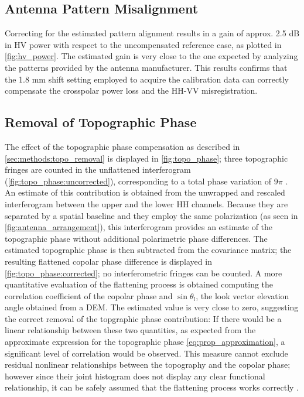 \subsection{Antenna Pattern Misalignment}\label{sec:discussion:misalignment}
Correcting for the estimated pattern alignment results in a gain of approx. 2.5 dB  in HV power with respect to the uncompensated reference case, as plotted in \autoref{fig:hv_power}. The estimated gain is very close to the one expected by analyzing the patterns provided by the antenna manufacturer. This results confirms that the 1.8 mm shift setting employed to acquire the calibration data can correctly compensate the crosspolar power loss and the HH-VV misregistration.
\subsection{Removal of Topographic Phase}
The effect of the topographic phase compensation as described in \autoref{sec:methods:topo_removal} is displayed in \autoref{fig:topo_phase};
three topographic fringes are counted in the unflattened interferogram (\autoref{fig:topo_phase:uncorrected}), corresponding to a total phase variation of $9 \pi$ . An estimate of this contribution is obtained from the unwrapped and rescaled interferogram between the upper and the lower HH channels. Because they are separated by a spatial baseline and they employ the same polarization (as seen in \autoref{fig:antenna_arrangement}), this interferogram provides an estimate of the topographic phase without additional polarimetric phase differences. The estimated topographic phase is then subtracted from the covariance matrix; the resulting flattened copolar phase difference is displayed in \autoref{fig:topo_phase:corrected}; no interferometric fringes can be counted. A more quantitative evaluation of the flattening process is obtained computing the correlation coefficient of the copolar phase and $\sin{\theta_l}$, the look vector elevation angle obtained from a DEM. The estimated value is very close to zero, suggesting the correct removal of the topgraphic phase contribution: If there would be a linear relationship between these two quantities, as expected from the approximate  expression for the topographic phase \eqref{eq:prop_approximation}, a significant level of correlation would be observed. This measure cannot exclude  residual nonlinear relationships between the topography and the copolar phase; however since their joint histogram does not display any clear functional relationship, it can be safely assumed that the flattening process works correctly .
